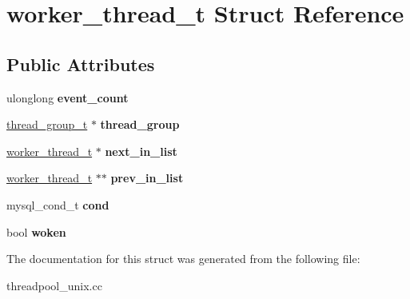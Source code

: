 \hypertarget{structworker__thread__t}{}\section{worker\+\_\+thread\+\_\+t Struct Reference}
\label{structworker__thread__t}
\subsection*{Public Attributes}
\begin{DoxyCompactItemize}
\item 
\mbox{\label{structworker__thread__t_a40be519ad0a8c61ce0bddd3c1b44fb13}} 
ulonglong {\bfseries event\+\_\+count}
\item 
\mbox{\label{structworker__thread__t_a0ce4af413e958017015f6eded4caf0ac}} 
\mbox{\hyperlink{structthread__group__t}{thread\+\_\+group\+\_\+t}} $\ast$ {\bfseries thread\+\_\+group}
\item 
\mbox{\label{structworker__thread__t_ab5400c5d63f4e1f842c13ddeb0b943e0}} 
\mbox{\hyperlink{structworker__thread__t}{worker\+\_\+thread\+\_\+t}} $\ast$ {\bfseries next\+\_\+in\+\_\+list}
\item 
\mbox{\label{structworker__thread__t_a7ca20c8fd0a8f14a40d11d0e6e8c26cb}} 
\mbox{\hyperlink{structworker__thread__t}{worker\+\_\+thread\+\_\+t}} $\ast$$\ast$ {\bfseries prev\+\_\+in\+\_\+list}
\item 
\mbox{\label{structworker__thread__t_a3c0264295d3dbacbef92a71da304ed47}} 
mysql\+\_\+cond\+\_\+t {\bfseries cond}
\item 
\mbox{\label{structworker__thread__t_aa6025cd51bec982eebc987e5deeb58c7}} 
bool {\bfseries woken}
\end{DoxyCompactItemize}


The documentation for this struct was generated from the following file\+:\begin{DoxyCompactItemize}
\item 
threadpool\+\_\+unix.\+cc\end{DoxyCompactItemize}

